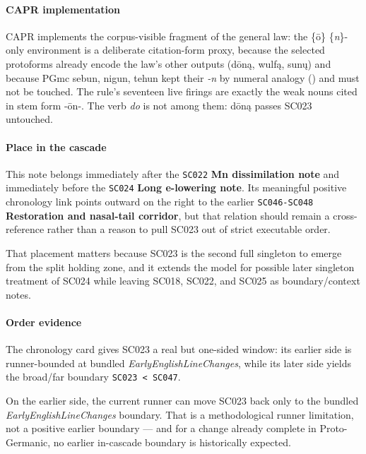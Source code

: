 \documentclass[
  british,
  a4paper,
]{article}
\begin{document}
\paragraph{CAPR implementation}\label{capr-implementation-16}

CAPR implements the corpus-visible fragment of the general law: the
\{ō\} \{\emph{n}\}-only environment is a deliberate citation-form proxy,
because the selected protoforms already encode the law's other outputs
(dōną, wulfą, sunų) and because PGmc sebun, nigun, tehun kept their
\emph{-n} by numeral analogy ()
and must not be touched. The rule's seventeen live firings are exactly
the weak nouns cited in stem form -ōn-. The verb \emph{do} is not among
them: dōną passes SC023 untouched.

\paragraph{Place in the cascade}\label{place-in-the-cascade-16}

This note belongs immediately after the \texttt{SC022} \textbf{Mn
dissimilation note} and immediately before the \texttt{SC024}
\textbf{Long e-lowering note}. Its meaningful positive chronology link
points outward on the right to the earlier \texttt{SC046-SC048}
\textbf{Restoration and nasal-tail corridor}, but that relation should
remain a cross-reference rather than a reason to pull SC023 out of
strict executable order.

That placement matters because SC023 is the second full singleton to
emerge from the split holding zone, and it extends the model for
possible later singleton treatment of SC024 while leaving SC018, SC022,
and SC025 as boundary/context notes.

\paragraph{Order evidence}\label{order-evidence-16}

The chronology card gives SC023 a real but one-sided window: its earlier
side is runner-bounded at bundled \emph{EarlyEnglishLineChanges}, while
its later side yields the broad/far boundary
\texttt{SC023\ \textless{}\ SC047}.

On the earlier side, the current runner can move SC023 back only to the
bundled \emph{EarlyEnglishLineChanges} boundary. That is a
methodological runner limitation, not a positive earlier boundary ---
and for a change already complete in Proto-Germanic, no earlier
in-cascade boundary is historically expected.
\end{document}
